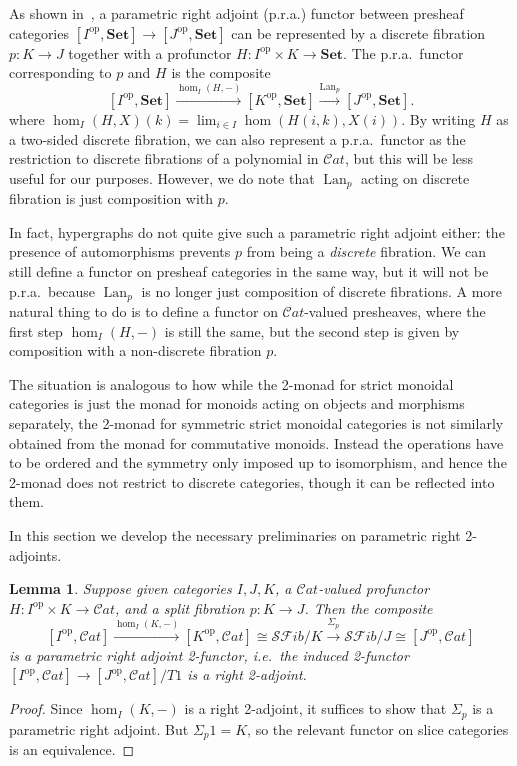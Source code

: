 \documentclass{article}
\newtheorem{lem}[thm]{Lemma}
\theoremstyle{definition}
\theoremstyle{remark}
\def\Set{\mathbf{Set}}
\def\Cat{\ensuremath{\mathcal{C}\mathit{at}}}
\def\SFib{\mathcal{SF}\mathit{ib}}
\def\op{^{\mathrm{op}}}
\def\lan{\operatorname{Lan}}
\let\xto\xrightarrow
\begin{document}
As shown in~\cite{weber:fam-pra}, a parametric right adjoint (p.r.a.) functor between presheaf categories $[I\op,\Set]\to [J\op,\Set]$ can be represented by a discrete fibration $p:K\to J$ together with a profunctor $H:I\op\times K\to\Set$.
The p.r.a.\ functor corresponding to $p$ and $H$ is the composite
\[ [I\op,\Set] \xto{\hom_I(H,-)} [K\op,\Set] \xto{\lan_p} [J\op,\Set]. \]
where $\hom_I(H,X)(k) = \lim_{i\in I} \hom(H(i,k),X(i))$.
By writing $H$ as a two-sided discrete fibration, we can also represent a p.r.a.\ functor as the restriction to discrete fibrations of a polynomial in \Cat, but this will be less useful for our purposes.
However, we do note that $\lan_p$ acting on discrete fibration is just composition with $p$.

In fact, hypergraphs do not quite give such a parametric right adjoint either: the presence of automorphisms prevents $p$ from being a \emph{discrete} fibration.
We can still define a functor on presheaf categories in the same way, but it will not be p.r.a.\ because $\lan_p$ is no longer just composition of discrete fibrations.
A more natural thing to do is to define a functor on \Cat-valued presheaves, where the first step $\hom_I(H,-)$ is still the same, but the second step is given by composition with a non-discrete fibration $p$.

The situation is analogous to how while the 2-monad for strict monoidal categories is just the monad for monoids acting on objects and morphisms separately, the 2-monad for symmetric strict monoidal categories is not similarly obtained from the monad for commutative monoids.
Instead the operations have to be ordered and the symmetry only imposed up to isomorphism, and hence the 2-monad does not restrict to discrete categories, though it can be reflected into them.

In this section we develop the necessary preliminaries on parametric right 2-adjoints.

\begin{lem}\label{thm:pra}
  Suppose given categories $I,J,K$, a \Cat-valued profunctor $H:I\op\times K\to \Cat$, and a split fibration $p:K\to J$.
  Then the composite
  \[ [I\op,\Cat] \xto{\hom_I(K,-)} [K\op,\Cat] \cong \SFib/K \xto{\Sigma_p} \SFib/J \cong [J\op,\Cat] \]
  is a parametric right adjoint 2-functor, i.e.\ the induced 2-functor $[I\op,\Cat] \to [J\op,\Cat]/T1$ is a right 2-adjoint.
\end{lem}
\begin{proof}
  Since $\hom_I(K,-)$ is a right 2-adjoint, it suffices to show that $\Sigma_p$ is a parametric right adjoint.
  But $\Sigma_p1 = K$, so the relevant functor on slice categories is an equivalence.
\end{proof}
\end{document}
